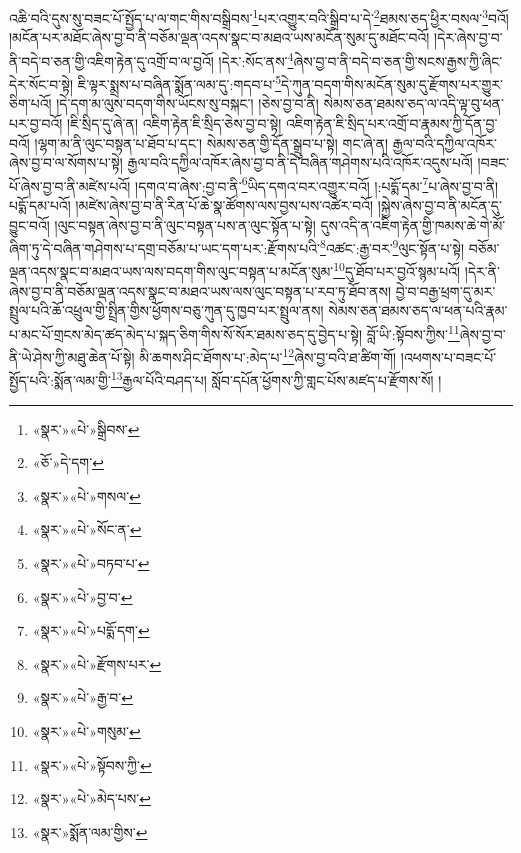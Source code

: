 འཆི་བའི་དུས་སུ་བཟང་པོ་སྤྱོད་པ་ལ་གང་གིས་བསྒྲིབས་\footnote{«སྣར་»«པེ་»སྒྲིབས་}པར་འགྱུར་བའི་སྒྲིབ་པ་དེ་\footnote{«ཅོ་»དེ་དག་}ཐམས་ཅད་ཕྱིར་བསལ་\footnote{«སྣར་»«པེ་»གསལ་}བའོ། །མངོན་པར་མཐོང་ཞེས་བྱ་བ་ནི་བཅོམ་ལྡན་འདས་སྣང་བ་མཐའ་ཡས་མངོན་སུམ་དུ་མཐོང་བའོ། །དེར་ཞེས་བྱ་བ་ནི་བདེ་བ་ཅན་གྱི་འཇིག་རྟེན་དུ་འགྲོ་བ་ལ་བྱའོ། །དེར་:སོང་ནས་\footnote{«སྣར་»«པེ་»སོང་ན་}ཞེས་བྱ་བ་ནི་བདེ་བ་ཅན་གྱི་སངས་རྒྱས་ཀྱི་ཞིང་དེར་སོང་བ་སྟེ། ཇི་ལྟར་སྨྲས་པ་བཞིན་སྨོན་ལམ་དུ་:གདབ་པ་\footnote{«སྣར་»«པེ་»བཏབ་པ་}དེ་ཀུན་བདག་གིས་མངོན་སུམ་དུ་རྫོགས་པར་གྱུར་ཅིག་པའོ། །དེ་དག་མ་ལུས་བདག་གིས་ཡོངས་སུ་བསྐང་། །ཅེས་བྱ་བ་ནི། སེམས་ཅན་ཐམས་ཅད་ལ་འདི་ལྟ་བུ་ཕན་པར་བྱ་བའོ། །ཇི་སྲིད་དུ་ཞེ་ན། འཇིག་རྟེན་ཇི་སྲིད་ཅེས་བྱ་བ་སྟེ། འཇིག་རྟེན་ཇི་སྲིད་པར་འགྲོ་བ་རྣམས་ཀྱི་དོན་བྱ་བའོ། །ལྷག་མ་ནི་ལུང་བསྟན་པ་ཐོབ་པ་དང་། སེམས་ཅན་གྱི་དོན་སྒྲུབ་པ་སྟེ། གང་ཞེ་ན། རྒྱལ་བའི་དཀྱིལ་འཁོར་ཞེས་བྱ་བ་ལ་སོགས་པ་སྟེ། རྒྱལ་བའི་དཀྱིལ་འཁོར་ཞེས་བྱ་བ་ནི་དེ་བཞིན་གཤེགས་པའི་འཁོར་འདུས་པའོ། །བཟང་པོ་ཞེས་བྱ་བ་ནི་མཛེས་པའོ། །དགའ་བ་ཞེས་:བྱ་བ་ནི་\footnote{«སྣར་»«པེ་»བྱ་བ་}ཡིད་དགའ་བར་འགྱུར་བའོ། །:པདྨོ་དམ་\footnote{«སྣར་»«པེ་»པདྨོ་དག་}པ་ཞེས་བྱ་བ་ནི། པདྨོ་དམ་པའོ། །མཛེས་ཞེས་བྱ་བ་ནི་རིན་པོ་ཆེ་སྣ་ཚོགས་ལས་བྱས་པས་འཚེར་བའོ། །སྐྱེས་ཞེས་བྱ་བ་ནི་མངོན་དུ་བྱུང་བའོ། །ལུང་བསྟན་ཞེས་བྱ་བ་ནི་ལུང་བསྟན་པས་ན་ལུང་སྟོན་པ་སྟེ། དུས་འདི་ན་འཇིག་རྟེན་གྱི་ཁམས་ཆེ་གེ་མོ་ཞིག་ཏུ་དེ་བཞིན་གཤེགས་པ་དགྲ་བཅོམ་པ་ཡང་དག་པར་:རྫོགས་པའི་\footnote{«སྣར་»«པེ་»རྫོགས་པར་}འཚང་:རྒྱ་བར་\footnote{«སྣར་»«པེ་»རྒྱ་བ་}ལུང་སྟོན་པ་སྟེ། བཅོམ་ལྡན་འདས་སྣང་བ་མཐའ་ཡས་ལས་བདག་གིས་ལུང་བསྟན་པ་མངོན་སུམ་\footnote{«སྣར་»«པེ་»གསུམ་}དུ་ཐོབ་པར་བྱའོ་སྙམ་པའོ། །དེར་ནི་ཞེས་བྱ་བ་ནི་བཅོམ་ལྡན་འདས་སྣང་བ་མཐའ་ཡས་ལས་ལུང་བསྟན་པ་རབ་ཏུ་ཐོབ་ནས། བྱེ་བ་བརྒྱ་ཕྲག་དུ་མར་སྤྲུལ་པའི་ཆོ་འཕྲུལ་གྱི་སྤྲིན་གྱིས་ཕྱོགས་བཅུ་ཀུན་དུ་ཁྱབ་པར་སྤྲུལ་ནས། སེམས་ཅན་ཐམས་ཅད་ལ་ཕན་པའི་རྣམ་པ་མང་པོ་གྲངས་མེད་ཚད་མེད་པ་སྐད་ཅིག་གིས་སོ་སོར་ཐམས་ཅད་དུ་བྱེད་པ་སྟེ། བློ་ཡི་:སྟོབས་ཀྱིས་\footnote{«སྣར་»«པེ་»སྟོབས་ཀྱི་}ཞེས་བྱ་བ་ནི་ཡེ་ཤེས་ཀྱི་མཐུ་ཆེན་པོ་སྟེ། མི་ཆགས་ཤིང་ཐོགས་པ་:མེད་པ་\footnote{«སྣར་»«པེ་»མེད་པས་}ཞེས་བྱ་བའི་ཐ་ཚིག་གོ། །འཕགས་པ་བཟང་པོ་སྤྱོད་པའི་:སྨོན་ལམ་གྱི་\footnote{«སྣར་»སྨོན་ལམ་གྱིས་}རྒྱལ་པོའི་བཤད་པ། སློབ་དཔོན་ཕྱོགས་ཀྱི་གླང་པོས་མཛད་པ་རྫོགས་སོ། ། 